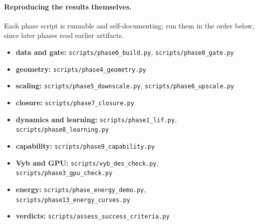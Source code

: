 \documentclass[11pt,a4paper]{article}
\newcommand{\code}[1]{\texttt{\footnotesize #1}}
\begin{document}
\paragraph{Reproducing the results themselves.}
Each phase script is runnable and self-documenting; run them in the order below, since later
phases read earlier artifacts.

{\sloppy
\begin{itemize}
\item \textbf{data and gate:} \code{scripts/phase0\_build.py}, \code{scripts/phase0\_gate.py}
\item \textbf{geometry:} \code{scripts/phase4\_geometry.py}
\item \textbf{scaling:} \code{scripts/phase5\_downscale.py}, \code{scripts/phase6\_upscale.py}
\item \textbf{closure:} \code{scripts/phase7\_closure.py}
\item \textbf{dynamics and learning:} \code{scripts/phase1\_lif.py}, \code{scripts/phase8\_learning.py}
\item \textbf{capability:} \code{scripts/phase9\_capability.py}
\item \textbf{Vyb and GPU:} \code{scripts/vyb\_des\_check.py}, \code{scripts/phase3\_gpu\_check.py}
\item \textbf{energy:} \code{scripts/phase\_energy\_demo.py}, \code{scripts/phase13\_energy\_curves.py}
\item \textbf{verdicts:} \code{scripts/assess\_success\_criteria.py}
\end{itemize}
}

\clearpage
\end{document}
